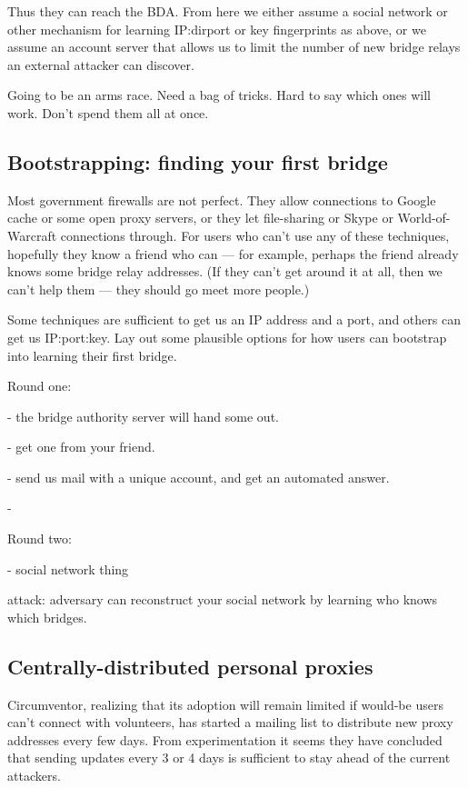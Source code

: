 \documentclass{llncs}
\begin{document}
Thus they can reach the BDA. From here we either assume a social
network or other mechanism for learning IP:dirport or key fingerprints
as above, or we assume an account server that allows us to limit the
number of new bridge relays an external attacker can discover.

Going to be an arms race. Need a bag of tricks. Hard to say
which ones will work. Don't spend them all at once.

\subsection{Bootstrapping: finding your first bridge}
\label{subsec:first-bridge}

Most government firewalls are not perfect. They allow connections to
Google cache or some open proxy servers, or they let file-sharing or
Skype or World-of-Warcraft connections through.
For users who can't use any of these techniques, hopefully they know
a friend who can --- for example, perhaps the friend already knows some
bridge relay addresses.
(If they can't get around it at all, then we can't help them --- they
should go meet more people.)

Some techniques are sufficient to get us an IP address and a port,
and others can get us IP:port:key. Lay out some plausible options
for how users can bootstrap into learning their first bridge.

Round one:

- the bridge authority server will hand some out.

- get one from your friend.

- send us mail with a unique account, and get an automated answer.

- 

Round two:

- social network thing

attack: adversary can reconstruct your social network by learning who
knows which bridges.

\subsection{Centrally-distributed personal proxies}

Circumventor, realizing that its adoption will remain limited if would-be
users can't connect with volunteers, has started a mailing list to
distribute new proxy addresses every few days. From experimentation
it seems they have concluded that sending updates every 3 or 4 days is
sufficient to stay ahead of the current attackers.
\end{document}
